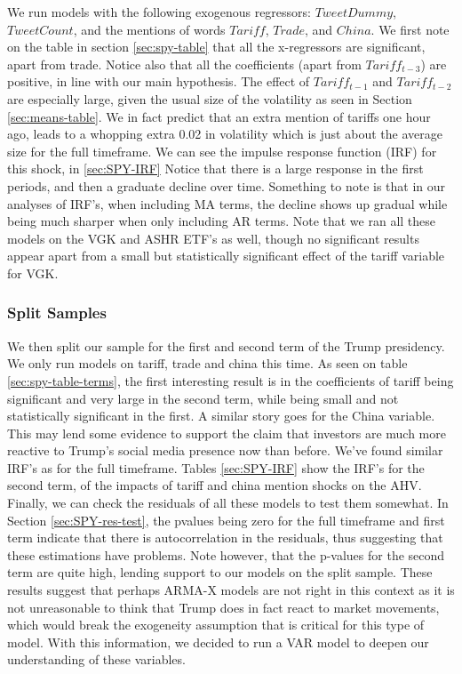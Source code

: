 \documentclass[
]{article}
\begin{document}
We run models with the following exogenous regressors: \(TweetDummy\), \(TweetCount\),
and the mentions of words \(Tariff\), \(Trade\), and \(China\). We first note on the table
in section \ref{sec:spy-table} that all the x-regressors are significant,
apart from trade. Notice also that all the coefficients (apart from \(Tariff_{t-3}\))
are positive, in line with our main hypothesis. The effect of \(Tariff_{t-1}\) and
\(Tariff_{t-2}\) are especially large, given the usual size of the volatility as seen
in Section \ref{sec:means-table}. We in fact predict that an
extra mention of tariffs one hour ago, leads to a whopping extra 0.02 in volatility
which is just about the average size for the full timeframe. We can see the
impulse response function (IRF) for this shock, in \ref{sec:SPY-IRF} Notice that
there is a large response in the first periods, and then a graduate
decline over time. Something to note is that in our analyses of IRF's, when including
MA terms, the decline shows up gradual while being much sharper when only including
AR terms.
Note that we ran all these models on the VGK and ASHR ETF's as well, though no
significant results appear apart from a small but statistically significant effect
of the tariff variable for VGK.

\subsubsection{Split Samples}\label{split-samples}

We then split our sample for the first and second term of the Trump presidency.
We only run models on tariff, trade and china this time. As seen on table
\ref{sec:spy-table-terms}, the first interesting result
is in the coefficients of tariff being significant and very large in the second
term, while being small and not statistically significant in the first. A similar
story goes for the China variable. This may lend some evidence to support the
claim that investors are much more reactive to Trump's social media presence
now than before. We've found similar IRF's as for the full timeframe. Tables \ref{sec:SPY-IRF}
show the IRF's for the second term, of the impacts of tariff and china mention
shocks on the AHV.
Finally, we can check the residuals of all these models to test them somewhat.
In Section \ref{sec:SPY-res-test}, the pvalues being zero
for the full timeframe and first term indicate that there is autocorrelation in
the residuals, thus suggesting that these estimations have problems. Note however,
that the p-values for the second term are quite high, lending support to our
models on the split sample. These results suggest that perhaps ARMA-X models are
not right in this context as it is not unreasonable to think that Trump does
in fact react to market movements, which would break the exogeneity assumption
that is critical for this type of model. With this information, we decided to run
a VAR model to deepen our understanding of these variables.
\end{document}
